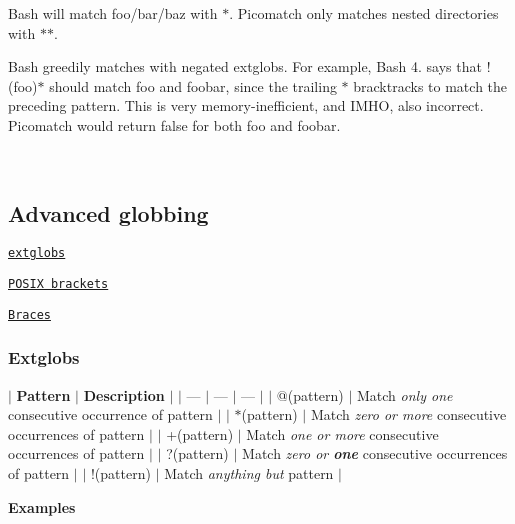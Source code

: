 \begin{DoxyItemize}
\item Bash will match {\ttfamily foo/bar/baz} with {\ttfamily $\ast$}. Picomatch only matches nested directories with {\ttfamily $\ast$$\ast$}.
\item Bash greedily matches with negated extglobs. For example, Bash 4. says that {\ttfamily !(foo)$\ast$} should match {\ttfamily foo} and {\ttfamily foobar}, since the trailing {\ttfamily $\ast$} bracktracks to match the preceding pattern. This is very memory-\/inefficient, and I\+M\+HO, also incorrect. Picomatch would return {\ttfamily false} for both {\ttfamily foo} and {\ttfamily foobar}.
\end{DoxyItemize}

~\newline


\subsection*{Advanced globbing}


\begin{DoxyItemize}
\item \href{#extglobs}{\tt extglobs}
\item \href{#posix-brackets}{\tt P\+O\+S\+IX brackets}
\item \href{#brace-expansion}{\tt Braces}
\end{DoxyItemize}

\subsubsection*{Extglobs}

$\vert$ {\bfseries Pattern} $\vert$ {\bfseries Description} $\vert$ $\vert$ --- $\vert$ --- $\vert$ --- $\vert$ $\vert$ {\ttfamily @(pattern)} $\vert$ Match {\itshape only one} consecutive occurrence of {\ttfamily pattern} $\vert$ $\vert$ {\ttfamily $\ast$(pattern)} $\vert$ Match {\itshape zero or more} consecutive occurrences of {\ttfamily pattern} $\vert$ $\vert$ {\ttfamily +(pattern)} $\vert$ Match {\itshape one or more} consecutive occurrences of {\ttfamily pattern} $\vert$ $\vert$ {\ttfamily ?(pattern)} $\vert$ Match {\itshape zero or {\bfseries one}} consecutive occurrences of {\ttfamily pattern} $\vert$ $\vert$ {\ttfamily !(pattern)} $\vert$ Match {\itshape anything but} {\ttfamily pattern} $\vert$

{\bfseries Examples}


